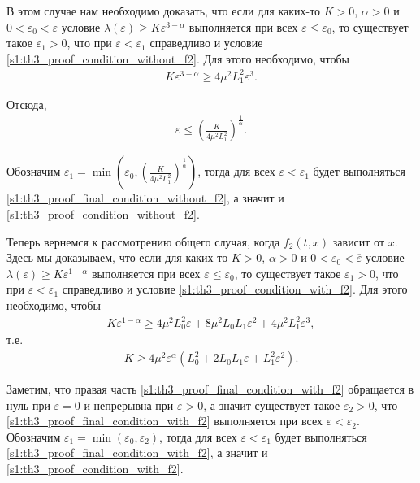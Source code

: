 \documentclass[../main.tex]{subfiles}
\begin{document}
В этом случае нам необходимо доказать, что если для каких-то $K > 0$, $\alpha > 0$ и $ 0 < \varepsilon_0 < \overline{\varepsilon}$ условие $ \lambda(\varepsilon) \geqslant  K\varepsilon ^{3 - \alpha} $ выполняется при всех $\varepsilon \leqslant \varepsilon_0$, то существует такое $ \varepsilon_1 > 0 $, что при  $\varepsilon < \varepsilon_1 $ справедливо и условие \eqref{s1:th3_proof_condition_without_f2}.
Для этого необходимо, чтобы 
\begin{gather}\label{s1:th3_proof_final_condition_without_f2}
	K\varepsilon ^{3 - \alpha} \geqslant 4 \mu^2  L_1^2 \varepsilon^3.
\end{gather}

 Отсюда,
 \begin{gather*}
 	\varepsilon \leqslant \left(\frac{K}{4 \mu^2  L_1^2}\right)^{\frac{1}{\alpha}}.
 \end{gather*}
 
 Обозначим $\varepsilon_1 = \min \left(\varepsilon_0,  \left(\frac{K}{4 \mu^2  L_1^2}\right)^{\frac{1}{\alpha}} \right) $, тогда для всех $\varepsilon < \varepsilon_1 $ будет выполняться \eqref{s1:th3_proof_final_condition_without_f2}, а значит и \eqref{s1:th3_proof_condition_without_f2}.
 

Теперь вернемся к рассмотрению общего случая, когда $f_2(t,x)$ зависит от $x$.
Здесь мы доказываем, что если для каких-то $K > 0$, $\alpha > 0$ и $ 0 < \varepsilon_0 < \overline{\varepsilon}$ условие $ \lambda(\varepsilon) \geqslant  K\varepsilon ^{1 - \alpha} $ выполняется при всех $\varepsilon \leqslant \varepsilon_0$, то существует такое $ \varepsilon_1 > 0 $, что при  $\varepsilon < \varepsilon_1 $ справедливо и условие \eqref{s1:th3_proof_condition_with_f2}. 
Для этого необходимо, чтобы 
\begin{gather*}
	K\varepsilon ^{1 - \alpha} \geqslant 4 \mu^2 L_0^2 \varepsilon  + 8 \mu^2 L_0 L_1 \varepsilon^2 +  4 \mu^2  L_1^2 \varepsilon^3,
\end{gather*}
т.е. 
\begin{gather}\label{s1:th3_proof_final_condition_with_f2}
	K \geqslant 4 \mu^2 \varepsilon^{\alpha} (L_0^2 + 2 L_0 L_1 \varepsilon + L_1^2 \varepsilon^2).
\end{gather}
 
 Заметим, что правая часть \eqref{s1:th3_proof_final_condition_with_f2} обращается в нуль при $\varepsilon = 0$ и непрерывна при $\varepsilon > 0$, а значит существует такое $\varepsilon_2 > 0$, что  \eqref{s1:th3_proof_final_condition_with_f2} выполняется при всех $\varepsilon < \varepsilon_2 $.
 Обозначим $\varepsilon_1 = \min \left(\varepsilon_0, \varepsilon_2\right) $, тогда для всех $\varepsilon < \varepsilon_1 $ будет выполняться \eqref{s1:th3_proof_final_condition_with_f2}, а значит и \eqref{s1:th3_proof_condition_with_f2}.
 
\end{document}
